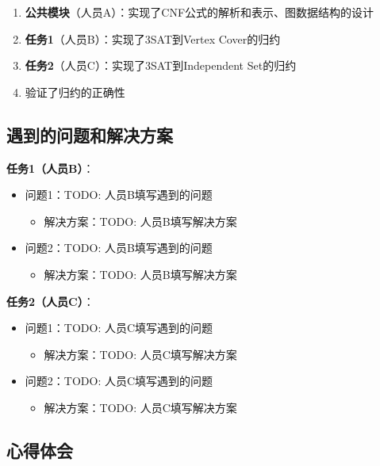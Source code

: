 \documentclass{sysucseexp}
\begin{document}
\begin{enumerate}
    \item \textbf{公共模块}（人员A）：实现了CNF公式的解析和表示、图数据结构的设计
    \item \textbf{任务1}（人员B）：实现了3SAT到Vertex Cover的归约 %
    \item \textbf{任务2}（人员C）：实现了3SAT到Independent Set的归约 %
    \item 验证了归约的正确性
\end{enumerate}

\subsection{遇到的问题和解决方案}

\textbf{任务1（人员B）}：
\begin{itemize}
    \item 问题1：TODO: 人员B填写遇到的问题
    \begin{itemize}
        \item 解决方案：TODO: 人员B填写解决方案
    \end{itemize}
    \item 问题2：TODO: 人员B填写遇到的问题
    \begin{itemize}
        \item 解决方案：TODO: 人员B填写解决方案
    \end{itemize}
\end{itemize}

\textbf{任务2（人员C）}：
\begin{itemize}
    \item 问题1：TODO: 人员C填写遇到的问题
    \begin{itemize}
        \item 解决方案：TODO: 人员C填写解决方案
    \end{itemize}
    \item 问题2：TODO: 人员C填写遇到的问题
    \begin{itemize}
        \item 解决方案：TODO: 人员C填写解决方案
    \end{itemize}
\end{itemize}

\subsection{心得体会}
\end{document}
